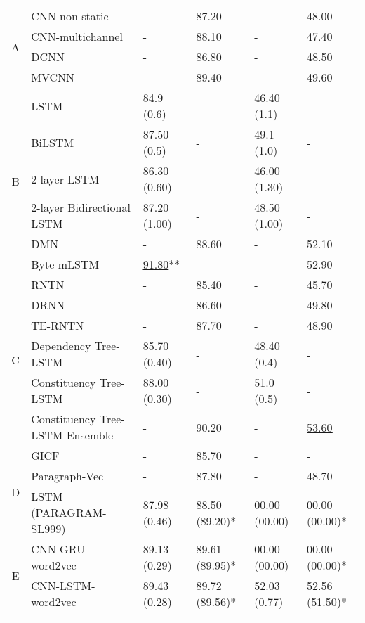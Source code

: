 \begin{table*}[]
\begin{tabular}{|c|l|ll|ll|}
		\multirow{4}{*}{A} & CNN-non-static~\cite{KimCNN} & - & 87.20 & - & 48.00 \Tstrut \\
		& CNN-multichannel~\cite{KimCNN} & - & 88.10 & - & 47.40\\
		& DCNN~\cite{DCNN} & - & 86.80 & - & 48.50 \\
		& MVCNN~\cite{2-layer-cnn} & - & 89.40 & - & 49.60 \\
		\hline
		\multirow{6}{*}{B} & LSTM~\cite{treeLSTM}   & 84.9 (0.6) & - & 46.40 (1.1)& - \\
		& BiLSTM~\cite{treeLSTM}  & 87.50 (0.5) & - & 49.1 (1.0) & -  \\
		& 2-layer LSTM~\cite{treeLSTM} & 86.30 (0.60) & - & 46.00 (1.30) & -\\
		& 2-layer Bidirectional LSTM~\cite{treeLSTM} & 87.20 (1.00) & - & 48.50 (1.00) & -\\
		& DMN~\cite{attention-gru} & - & 88.60 & - & 52.10 \\
		& Byte mLSTM~\cite{mlstm} & \underline{\underline{91.80}}** & - & - & 52.90 \\
		\hline
		\multirow{6}{*}{C} & RNTN~\cite{socher2013recursive}  & - & 85.40 & - & 45.70 \\
		& DRNN~\cite{IrsoyDRNN} & - & 86.60 & - & 49.80  \\
		& TE-RNTN~\cite{tag-embedding-rnn} & - & 87.70 & - & 48.90\\
		& Dependency Tree-LSTM~\cite{treeLSTM}  & 85.70 (0.40)  & - & 48.40 (0.4) & - \\
		& Constituency Tree-LSTM~\cite{treeLSTM} & 88.00 (0.30)    &  - & 51.0 (0.5) & - \\
		& Constituency Tree-LSTM Ensemble~\cite{LooksHHN17} & - & 90.20 & - & \underline{\underline{53.60}} \\
		\hline
		\multirow{3}{*}{D} & GICF~\cite{group-instance} & - & 85.70 & - & - \\
		& Paragraph-Vec~\cite{ParagraphVec} & - & 87.80 & - & 48.70 \\
		& LSTM (PARAGRAM-SL999)~\cite{wieting2015towards} & 87.98 (0.46) & 88.50 (89.20)* & 00.00 (00.00)  & 00.00 (00.00)*
		\\
		\hline
		\multirow{2}{*}{E}  & CNN-GRU-word2vec~\cite{cnn-rnn}                    & 89.13 (0.29)  &  89.61 (89.95)* & 00.00 (00.00) & 00.00 (00.00)*   \\
		& CNN-LSTM-word2vec~\cite{cnn-rnn}                    & 89.43 (0.28)  & 89.72 (89.56)* & 52.03 (0.77) & 52.56 (51.50)* \Bstrut    \\
		\Xhline{3\arrayrulewidth}

\end{tabular}
\end{table*}
